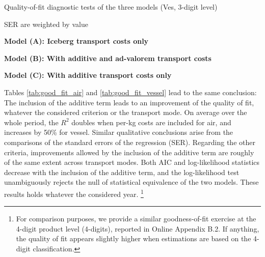 \documentclass[a4paper,11pt]{article}
\begin{document}
\begin{table}[htbp]
	\centering
	\footnotesize{
		\caption{Quality-of-fit diagnostic tests of the three models (Ves, 3-digit level)}\vspace{5mm}
		\label{tab:good_fit_vessel}%
		
		\begin{tablenotes}
			\tiny
			\item SER are weighted by value
			\item \textbf{Model (A): Iceberg transport costs only}
			\item \textbf{Model (B): With additive and ad-valorem transport costs}
			\item \textbf{Model (C): With additive transport costs only}
\end{tablenotes}
}
\end{table}%


Tables \ref{tab:good_fit_air} and \ref{tab:good_fit_vessel} lead to the same conclusion: The inclusion of the additive term leads to an improvement of the quality of fit, whatever the considered criterion or the transport mode.
On average over the whole period, the $R^{2}$ doubles when per-kg costs are included for air, and increases by 50\% for vessel.
Similar qualitative conclusions arise from the comparisons of the standard errors of the regression (SER).
Regarding the other criteria, improvements allowed by the inclusion of the additive term are roughly of the same extent across transport modes.
Both AIC and log-likelihood statistics decrease with the inclusion of the additive term, and the log-likelihood test unambiguously rejects the null of statistical equivalence of the two models.
These results holds whatever the considered year. \footnote{For comparison purposes, we provide a similar goodness-of-fit exercise at the 4-digit product level (4-digits), reported in Online Appendix B.2. If anything, the quality of fit appears slightly higher when estimations are based on the 4-digit classification.}
\end{document}
